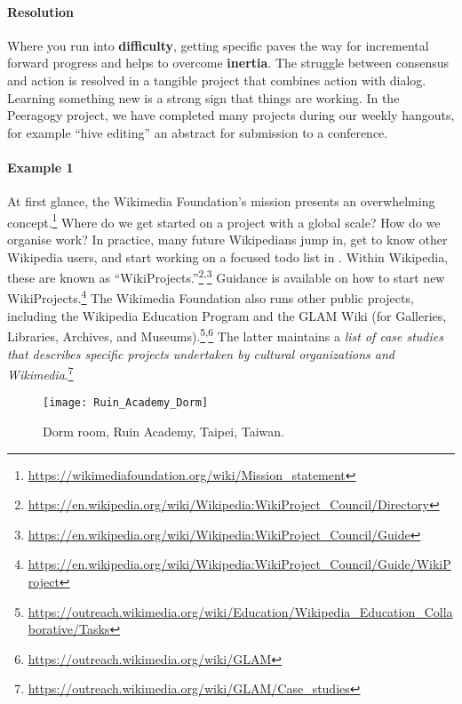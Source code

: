 \begin{refsection}
\paragraph{Resolution}
Where you run into \textbf{difficulty}, getting specific paves the way for incremental forward progress and helps to overcome \textbf{inertia}. The struggle between consensus and action is resolved in a tangible project that combines action with dialog. Learning something new is a strong sign that things are working.
In the Peeragogy project, we have completed many projects during our weekly hangouts, for example ``hive editing'' an abstract for submission to a conference.

\paragraph{Example 1}
At first glance, the Wikimedia Foundation's mission presents an overwhelming concept.\footnote{\url{https://wikimediafoundation.org/wiki/Mission_statement}} Where do we get started on a project with a global scale? How do we organise work?
In practice, many future Wikipedians jump in, get to know other Wikipedia users, and start working on a focused todo list in
.
Within Wikipedia, these are known as ``WikiProjects.''\footnote{\url{https://en.wikipedia.org/wiki/Wikipedia:WikiProject_Council/Directory}}\textsuperscript{,}\footnote{\url{https://en.wikipedia.org/wiki/Wikipedia:WikiProject_Council/Guide}}
Guidance is available on how to start new WikiProjects.\footnote{\url{https://en.wikipedia.org/wiki/Wikipedia:WikiProject_Council/Guide/WikiProject}}
The Wikimedia Foundation also runs other public projects, including the Wikipedia Education Program and the GLAM Wiki (for Galleries, Libraries, Archives, and Museums).\footnote{\url{https://outreach.wikimedia.org/wiki/Education/Wikipedia_Education_Collaborative/Tasks}}\textsuperscript{,}\footnote{\url{https://outreach.wikimedia.org/wiki/GLAM}}  The latter maintains a \emph{list of case studies that describes specific projects undertaken by cultural organizations and Wikimedia}.\footnote{\url{https://outreach.wikimedia.org/wiki/GLAM/Case_studies}}

\begin{wrapfigure}{r}{.47\textwidth}
\vspace{-1.0cm}
\begin{center}
\texttt{[image: Ruin\_Academy\_Dorm]}
\end{center}
\vspace{-.5cm}
\caption{Dorm room, Ruin Academy, Taipei, Taiwan. 
\label{dormitory}
}
\vspace{-1.1cm}
\end{wrapfigure}


\end{refsection}
